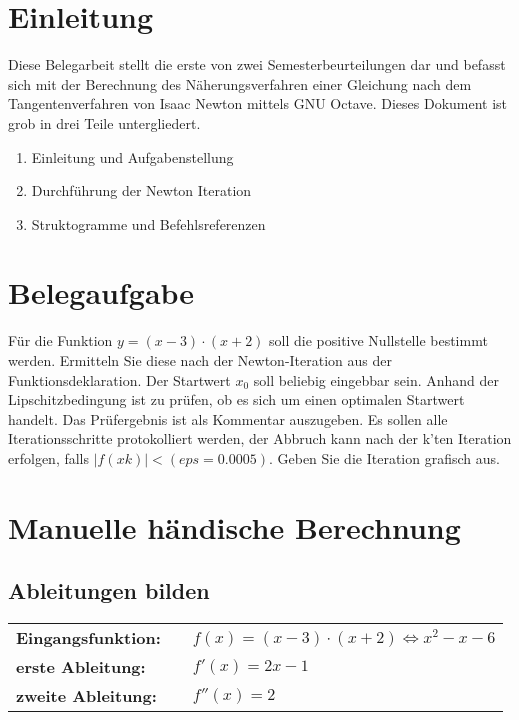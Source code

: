 \documentclass[a4paper]{scrartcl}
\begin{document}
\thispagestyle{empty}

\tableofcontents

\newpage
\setcounter{page}{3}
\section{Einleitung}
Diese Belegarbeit stellt die erste von zwei Semesterbeurteilungen  dar und befasst sich mit der Berechnung  des
Näherungsverfahren einer Gleichung nach dem Tangentenverfahren von Isaac Newton mittels GNU Octave. Dieses 
Dokument ist grob in drei Teile untergliedert.
\begin{enumerate}
	\item Einleitung und Aufgabenstellung
	\item Durchführung der Newton Iteration
	\item Struktogramme und Befehlsreferenzen
\end{enumerate}


\section{Belegaufgabe}
Für die Funktion $y= (x-3) \cdot (x+2)$ soll die positive Nullstelle bestimmt werden. Ermitteln Sie diese
nach der Newton-Iteration aus der Funktionsdeklaration. Der Startwert $x_{0}$ soll beliebig eingebbar
sein. Anhand der Lipschitzbedingung ist zu prüfen, ob es sich um einen optimalen Startwert handelt.
Das Prüfergebnis ist als Kommentar auszugeben. Es sollen alle Iterationsschritte protokolliert 
werden, der Abbruch kann nach der k'ten Iteration erfolgen, falls $| f(xk) |< (eps=0.0005)$. 
Geben Sie die Iteration grafisch aus.

\section{Manuelle \glqq{}händische\grqq{}  Berechnung}

	\subsection{Ableitungen bilden}
	\begin{tabular}{lll}
		\textbf{Eingangsfunktion:} & & $f(x) =  (x-3) \cdot (x+2) \Leftrightarrow x^2-x-6$ \\
		\textbf{erste Ableitung:} & & $f'(x) = 2x-1$\\
		\textbf{zweite Ableitung:} & & $f''(x) = 2$\\
	\end{tabular}
	
\end{document}
